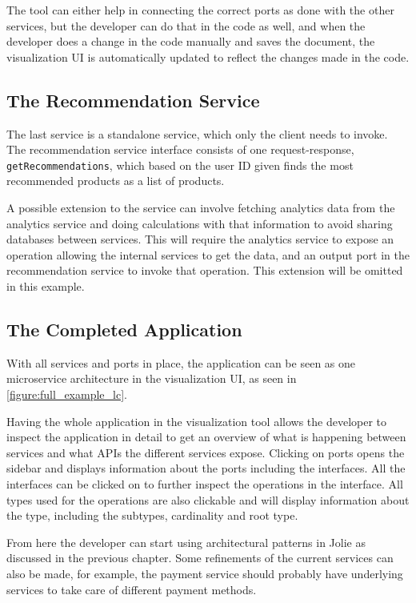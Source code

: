 The tool can either help in connecting the correct ports as done with the other services, but the developer can do that in the code as well, and when the developer does a change in the code manually and saves the document, the visualization UI is automatically updated to reflect the changes made in the code.

\subsection{The Recommendation Service}
The last service is a standalone service, which only the client needs to invoke.
The recommendation service interface consists of one request-response, \texttt{getRecommendations},
which based on the user ID given finds the most recommended products as a list of products.

A possible extension to the service can involve fetching analytics data from the analytics service and doing calculations with that information to avoid sharing databases between services. This will require the analytics service to expose an operation allowing the internal services to get the data, and an output port in the recommendation service to invoke that operation.
This extension will be omitted in this example.

\subsection{The Completed Application}
With all services and ports in place, the application can be seen as one microservice architecture in the visualization UI, as seen in \cref{figure:full_example_lc}.

Having the whole application in the visualization tool allows the developer to inspect the application in detail to get an overview of what is happening between services and what APIs the different services expose.
Clicking on ports opens the sidebar and displays information about the ports including the interfaces. All the interfaces can be clicked on to further inspect the operations in the interface. All types used for the operations are also clickable and will display information about the type,
including the subtypes, cardinality and root type.

From here the developer can start using architectural patterns in Jolie as discussed in the previous chapter. Some refinements of the current services can also be made, for example, the payment service should probably have underlying services to take care of different payment methods.

